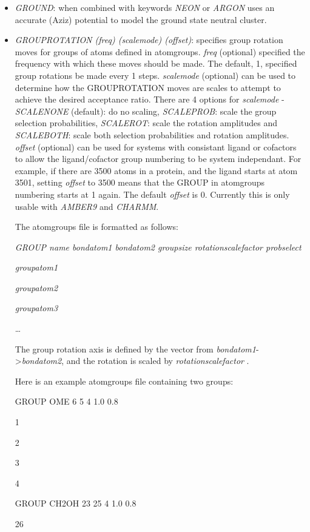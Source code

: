 \documentclass[12pt,a4paper,dvips]{article}
\begin{document}
\begin{itemize}
\item {\it GROUND\/}: when combined with keywords {\it NEON\/} or {\it ARGON\/}
uses an accurate (Aziz) potential to model the ground state neutral cluster.

\item {\it GROUPROTATION (freq) (scalemode) (offset)\/}: specifies group rotation moves for groups of atoms defined in {\rm atomgroups}. {\it freq\/} 
(optional) specified the frequency with which these moves should be made. The default, 1, specified group rotations be made every 1 steps. 
{\it scalemode\/} (optional) can be used to determine how the GROUPROTATION moves are scales to attempt to achieve the desired acceptance ratio.
There are 4 options for {\it scalemode} - {\it SCALENONE\/} (default): do no scaling, {\it SCALEPROB\/}: scale the group selection probabilities, {\it SCALEROT}: scale
the rotation amplitudes and {\it SCALEBOTH}: scale both selection probabilities and rotation amplitudes.
{\it offset\/} (optional) can be used for systems with consistant ligand or cofactors to allow the ligand/cofactor group numbering to be
system independant. For example, if there are 3500 atoms in a protein, and the ligand starts at atom 3501, setting {\it offset} to 3500 means
that the GROUP in {\textrm atomgroups} numbering starts at 1 again. The default {\it offset\/} is 0. Currently this is only usable with 
{\it AMBER9\/} and {\it CHARMM\/}.

The {\textrm atomgroups} file is formatted as follows:

{\it GROUP name bondatom1 bondatom2 groupsize rotationscalefactor probselect}

{\it groupatom1}

{\it groupatom2}

{\it groupatom3}

\ldots

The group rotation axis is defined by the vector from {\it bondatom1}->{\it bondatom2}, and the rotation is scaled by {\it rotationscalefactor}
.

Here is an example {\textrm atomgroups} file containing two groups:

{\textrm GROUP OME 6 5 4 1.0 0.8}

{\textrm 1}

{\textrm 2}

{\textrm 3}

{\textrm 4}

{\textrm GROUP CH2OH 23 25 4 1.0 0.8}

{\textrm 26}


\end{itemize}
\end{document}
